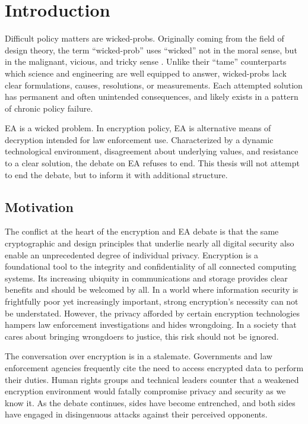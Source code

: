 \chapter{Introduction}
\label{chap-introduction}

Difficult policy matters are \acp{wicked-prob}. Originally coming from the field of design theory, the term
``\ac{wicked-prob}'' uses ``wicked'' not in the moral sense, but in the malignant, vicious, and tricky sense
\cite{rittel_dilemmas_1973}. Unlike their ``tame'' counterparts which science and engineering are well equipped to
answer, \acp{wicked-prob} lack clear formulations, causes, resolutions, or measurements. Each attempted solution has
permanent and often unintended consequences, and likely exists in a pattern of chronic policy failure.

\Acl{EA} is a wicked problem. In encryption policy, \ac{EA} is alternative means of decryption intended for law
enforcement use. Characterized by a dynamic technological environment, disagreement about underlying values, and
resistance to a clear solution, the debate on \ac{EA} refuses to end. This thesis will not attempt to end the debate,
but to inform it with additional structure.


\section{Motivation}
\label{sec-motivation}

The conflict at the heart of the encryption and \ac{EA} debate is that the same cryptographic and design principles that
underlie nearly all digital security also enable an unprecedented degree of individual privacy. Encryption is a
foundational tool to the integrity and confidentiality of all connected computing systems. Its increasing ubiquity in
communications and storage provides clear benefits and should be welcomed by all. In a world where information security
is frightfully poor yet increasingly important, strong encryption's necessity can not be understated. However, the
privacy afforded by certain encryption technologies hampers law enforcement investigations and hides wrongdoing. 
In a
society that cares about bringing wrongdoers to justice, this risk should not be ignored.

The conversation over encryption is in a stalemate. Governments and law enforcement agencies frequently cite the need to
access encrypted data to perform their duties. 
Human rights groups and technical leaders counter that a weakened
encryption environment would fatally compromise privacy and security as we know it. 
As the debate continues, sides have
become entrenched, and both sides have engaged in disingenuous attacks against their perceived opponents.

